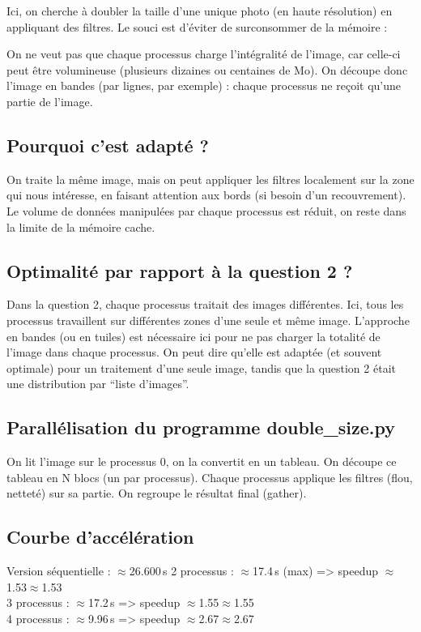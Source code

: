 \documentclass[a4paper,13pt]{book}
\begin{document}
Ici, on cherche à doubler la taille d’une unique photo (en haute résolution) en appliquant des filtres. Le souci est d’éviter de surconsommer de la mémoire :

    On ne veut pas que chaque processus charge l’intégralité de l’image, car celle-ci peut être volumineuse (plusieurs dizaines ou centaines de Mo).
    On découpe donc l’image en bandes (par lignes, par exemple) : chaque processus ne reçoit qu’une partie de l’image.

\subsection{Pourquoi c’est adapté ?}

    On traite la même image, mais on peut appliquer les filtres localement sur la zone qui nous intéresse, en faisant attention aux bords (si besoin d’un recouvrement).
    Le volume de données manipulées par chaque processus est réduit, on reste dans la limite de la mémoire cache.

\subsection{Optimalité par rapport à la question 2 ?}

    Dans la question 2, chaque processus traitait des images différentes. Ici, tous les processus travaillent sur différentes zones d’une seule et même image.
    L’approche en bandes (ou en tuiles) est nécessaire ici pour ne pas charger la totalité de l’image dans chaque processus.
    On peut dire qu’elle est adaptée (et souvent optimale) pour un traitement d’une seule image, tandis que la question 2 était une distribution par “liste d’images”.

\subsection{ Parallélisation du programme double\_size.py}

    On lit l’image sur le processus 0, on la convertit en un tableau.
    On découpe ce tableau en N blocs (un par processus).
    Chaque processus applique les filtres (flou, netteté) sur sa partie.
    On regroupe le résultat final (gather).

\subsection{Courbe d’accélération}


    Version séquentielle : $\approx$26.600 s
    2 processus : $\approx$17.4 s (max) => speedup $\approx$1.53$\approx$1.53\\
    3 processus : $\approx$17.2 s => speedup $\approx$1.55$\approx$1.55\\
    4 processus : $\approx$9.96 s => speedup $\approx$2.67$\approx$2.67
\end{document}
